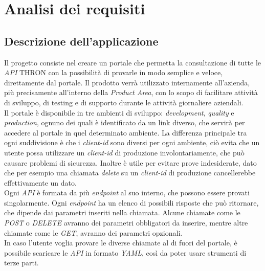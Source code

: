 \chapter{Analisi dei requisiti}\label{cap:analisi-requisiti}

 
\section{Descrizione dell'applicazione}\label{sec:descrizione-applicazione}

Il progetto consiste nel creare un portale che permetta la consultazione di tutte le \textit{API} THRON con la possibilità di provarle in modo semplice e veloce, direttamente dal portale.
Il prodotto verrà utilizzato internamente all'azienda, più precisamente all'interno della \textit{Product Area}, con lo scopo di facilitare attività di sviluppo, di testing e di supporto durante le attività giornaliere aziendali.\\
Il portale è disponibile in tre ambienti di sviluppo: \textit{development}, \textit{quality} e \textit{production}, ognuno dei quali è identificato da un link diverso, che servirà per accedere al portale in quel determinato ambiente.
La differenza principale tra ogni suddivisione è che i \textit{client-id} sono diversi per ogni ambiente, ciò evita che un utente possa utilizzare un \textit{client-id} di produzione involontariamente, che può causare problemi di sicurezza. Inoltre è utile per evitare prove indesiderate, dato che per esempio una chiamata \textit{delete} su un \textit{client-id} di produzione cancellerebbe effettivamente un dato.\\
Ogni \textit{API} è formata da più \textit{endpoint} al suo interno, che possono essere provati singolarmente. Ogni \textit{endpoint} ha un elenco di possibili risposte che può ritornare, che dipende dai parametri inseriti nella chiamata.
Alcune chiamate come le \textit{POST} o \textit{DELETE} avranno dei parametri obbligatori da inserire, mentre altre chiamate come le \textit{GET}, avranno dei parametri opzionali.\\
In caso l'utente voglia provare le diverse chiamate al di fuori del portale, è possibile scaricare le \textit{API} in formato \textit{YAML}, così da poter usare strumenti di terze parti.


